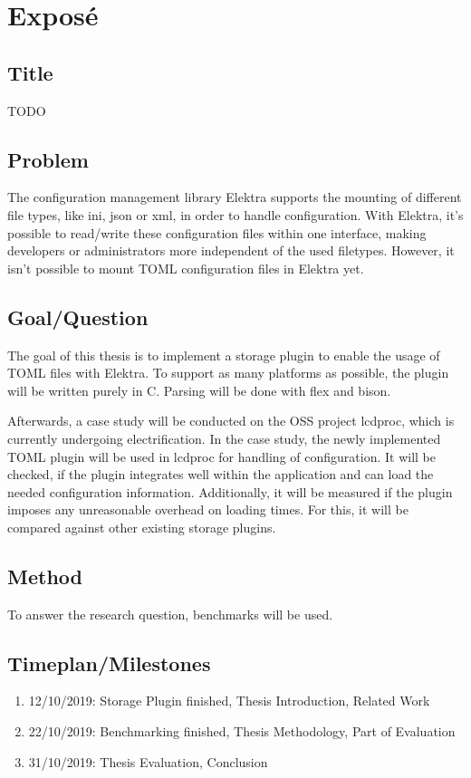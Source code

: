 \documentclass[12pt]{article}
\begin{document}
\thispagestyle{empty}


\section{Exposé}

\subsection{Title}
TODO

\subsection{Problem}

The configuration management library Elektra supports the mounting of different file types, like ini, json or xml, in order to handle configuration. With Elektra, it's possible to read/write these configuration files within one interface, making developers or administrators more independent of the used filetypes. However, it isn't possible to mount TOML configuration files in Elektra yet.

\subsection{Goal/Question}
The goal of this thesis is to implement a storage plugin to enable the usage of TOML files with Elektra.
To support as many platforms as possible, the plugin will be written purely in C. Parsing will be done with flex and bison.

Afterwards, a case study will be conducted on the OSS project lcdproc, which is currently undergoing electrification.
In the case study, the newly implemented TOML plugin will be used in lcdproc for handling of configuration.
It will be checked, if the plugin integrates well within the application and can load the needed configuration information.
Additionally, it will be measured if the plugin imposes any unreasonable overhead on loading times.
For this, it will be compared against other existing storage plugins.

\subsection{Method}

To answer the research question, benchmarks will be used.

\subsection{Timeplan/Milestones}
\begin{enumerate}
\item 12/10/2019: Storage Plugin finished, Thesis Introduction, Related Work
\item 22/10/2019: Benchmarking finished, Thesis Methodology, Part of Evaluation
\item 31/10/2019: Thesis Evaluation, Conclusion 
\end{enumerate}
\end{document}
